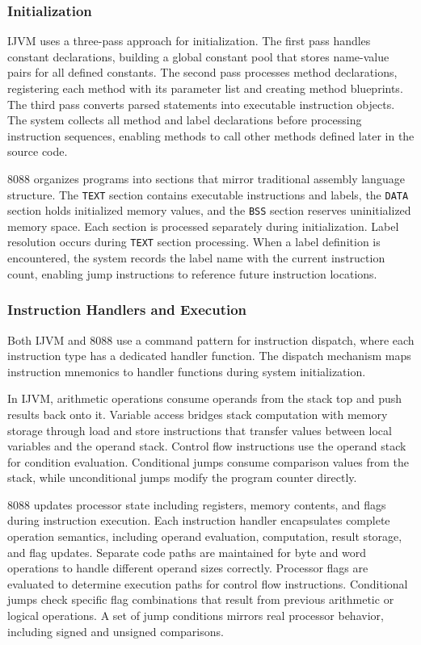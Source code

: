\documentclass[11pt]{article}
\begin{document}
\subsubsection{Initialization}
IJVM uses a three-pass approach for initialization. The first pass handles constant declarations, building a global constant pool that stores name-value pairs for all defined constants. The second pass processes method declarations, registering each method with its parameter list and creating method blueprints. The third pass converts parsed statements into executable instruction objects. The system collects all method and label declarations before processing instruction sequences, enabling methods to call other methods defined later in the source code.

8088 organizes programs into sections that mirror traditional assembly language structure. The \texttt{TEXT} section contains executable instructions and labels, the \texttt{DATA} section holds initialized memory values, and the \texttt{BSS} section reserves uninitialized memory space. Each section is processed separately during initialization. Label resolution occurs during \texttt{TEXT} section processing. When a label definition is encountered, the system records the label name with the current instruction count, enabling jump instructions to reference future instruction locations.

\subsubsection{Instruction Handlers and Execution}
Both IJVM and 8088 use a command pattern for instruction dispatch, where each instruction type has a dedicated handler function. The dispatch mechanism maps instruction mnemonics to handler functions during system initialization.

In IJVM, arithmetic operations consume operands from the stack top and push results back onto it. Variable access bridges stack computation with memory storage through load and store instructions that transfer values between local variables and the operand stack. Control flow instructions use the operand stack for condition evaluation. Conditional jumps consume comparison values from the stack, while unconditional jumps modify the program counter directly.

8088 updates processor state including registers, memory contents, and flags during instruction execution. Each instruction handler encapsulates complete operation semantics, including operand evaluation, computation, result storage, and flag updates. Separate code paths are maintained for byte and word operations to handle different operand sizes correctly. Processor flags are evaluated to determine execution paths for control flow instructions. Conditional jumps check specific flag combinations that result from previous arithmetic or logical operations. A set of jump conditions mirrors real processor behavior, including signed and unsigned comparisons.
\end{document}
